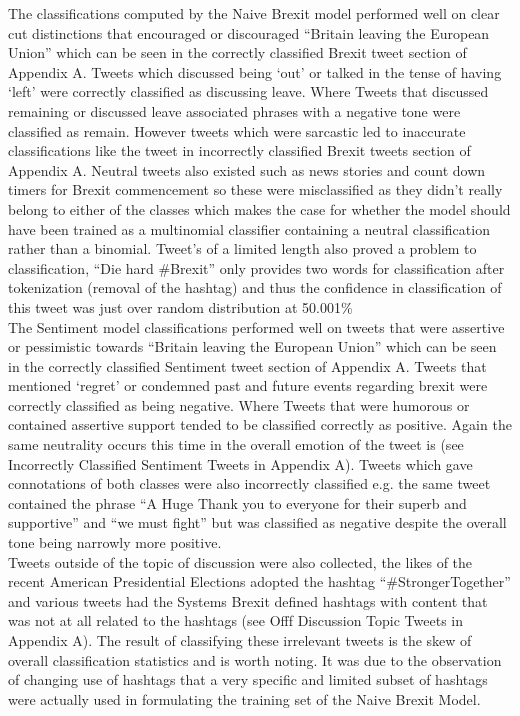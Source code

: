 \documentclass[11pt]{report}
\begin{document}
The classifications computed by the Naive Brexit model performed well on clear cut distinctions that encouraged or discouraged ``Britain leaving the European Union'' which can be seen in the correctly classified Brexit tweet section of Appendix A. Tweets which discussed being `out' or talked in the tense of having `left' were correctly classified as discussing leave. Where Tweets that discussed remaining or discussed leave associated phrases with a negative tone were classified as remain. However tweets which were sarcastic led to inaccurate classifications like the tweet in incorrectly classified Brexit tweets section of Appendix A. Neutral tweets also existed such as news stories and count down timers for Brexit commencement so these were misclassified as they didn't really belong to either of the classes which makes the case for whether the model should have been trained as a multinomial classifier containing a neutral classification rather than a binomial. Tweet's of a limited length also proved a problem to classification, ``Die hard \#Brexit'' only provides two words for classification after tokenization (removal of the hashtag) and thus the confidence in classification of this tweet was just over random distribution at 50.001\%
\\

The Sentiment model classifications performed well on tweets that were assertive or pessimistic towards ``Britain leaving the European Union'' which can be seen in the correctly classified Sentiment tweet section of Appendix A. Tweets that mentioned `regret' or condemned past and future events regarding brexit were correctly classified as being negative. Where Tweets that were humorous or contained assertive support tended to be classified correctly as positive. Again the same neutrality occurs this time in the overall emotion of the tweet is (see Incorrectly Classified Sentiment Tweets in Appendix A). Tweets which gave connotations of both classes were also incorrectly classified e.g. the same tweet contained the phrase ``A Huge Thank you to everyone for their superb and supportive'' and ``we must fight'' but was classified as negative despite the overall tone being narrowly more positive.
\\

Tweets outside of the topic of discussion were also collected, the likes of the recent American Presidential Elections adopted the hashtag ``\#StrongerTogether'' and various tweets had the Systems Brexit defined hashtags with content that was not at all related to the hashtags (see Offf Discussion Topic Tweets in Appendix A). The result of classifying these irrelevant tweets is the skew of overall classification statistics and is worth noting. It was due to the observation of changing use of hashtags that a very specific and limited subset of hashtags were actually used in formulating the training set of the Naive Brexit Model.
\end{document}
